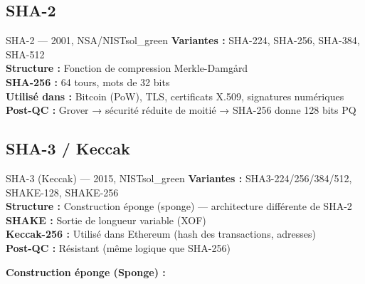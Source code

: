 \documentclass[12pt, a4paper]{article}
\begin{document}
\subsection{SHA-2}

\begin{algobox}{SHA-2 --- 2001, NSA/NIST}{sol_green}
\textbf{Variantes :} SHA-224, SHA-256, SHA-384, SHA-512\\
\textbf{Structure :} Fonction de compression Merkle-Damgård\\
\textbf{SHA-256 :} 64 tours, mots de 32 bits\\
\textbf{Utilisé dans :} Bitcoin (PoW), TLS, certificats X.509, signatures numériques\\
\textbf{Post-QC :} Grover → sécurité réduite de moitié → SHA-256 donne 128 bits PQ
\end{algobox}

\subsection{SHA-3 / Keccak}

\begin{algobox}{SHA-3 (Keccak) --- 2015, NIST}{sol_green}
\textbf{Variantes :} SHA3-224/256/384/512, SHAKE-128, SHAKE-256\\
\textbf{Structure :} Construction éponge (sponge) --- architecture différente de SHA-2\\
\textbf{SHAKE :} Sortie de longueur variable (XOF)\\
\textbf{Keccak-256 :} Utilisé dans Ethereum (hash des transactions, adresses)\\
\textbf{Post-QC :} Résistant (même logique que SHA-256)
\end{algobox}

\textbf{Construction éponge (Sponge) :}
\begin{center}
\end{center}
\end{document}
